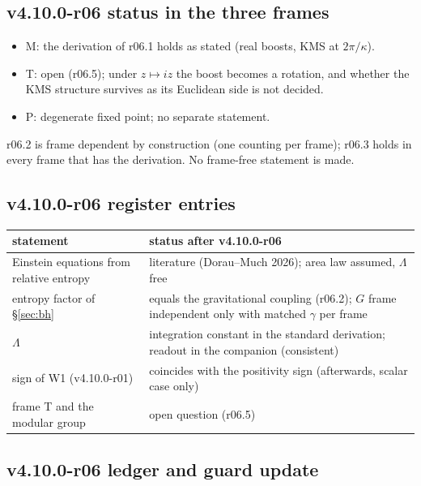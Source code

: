 \subsection*{v4.10.0-r06 status in the three frames}
\label{subsec:v4100-r06-frames}

\begin{itemize}[leftmargin=2em]
\item M: the derivation of r06.1 holds as stated (real boosts, KMS at \(2\pi/\kappa\)).
\item T: open (r06.5); under \(z\mapsto iz\) the boost becomes a rotation, and whether the KMS structure survives as its Euclidean side is not decided.
\item P: degenerate fixed point; no separate statement.
\end{itemize}
r06.2 is frame dependent by construction (one counting per frame); r06.3 holds in every frame that has the derivation.  No frame-free statement is made.

\subsection*{v4.10.0-r06 register entries}
\label{subsec:v4100-r06-register}

\begin{center}
\small
\begin{tabular}{@{}>{\raggedright\arraybackslash}p{}>{\raggedright\arraybackslash}p{}@{}}
\toprule
statement & status after v4.10.0-r06\\
\midrule
Einstein equations from relative entropy & literature (Dorau--Much 2026); area law assumed, \(\Lambda\) free\\
entropy factor of \S\ref{sec:bh} & equals the gravitational coupling (r06.2); \(G\) frame independent only with matched \(\gamma\) per frame\\
\(\Lambda\) & integration constant in the standard derivation; readout in the companion (consistent)\\
sign of W1 (v4.10.0-r01) & coincides with the positivity sign (afterwards, scalar case only)\\
frame T and the modular group & open question (r06.5)\\
\bottomrule
\end{tabular}
\end{center}

\subsection*{v4.10.0-r06 ledger and guard update}
\label{subsec:v4100-r06-ledger-guard}

